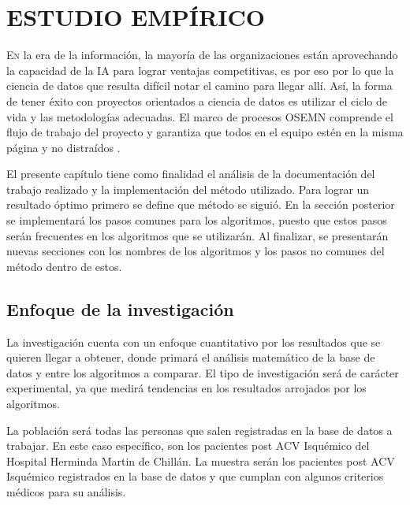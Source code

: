\doublespacing
\chapter{ESTUDIO EMPÍRICO}

\lettrine[lines=4, slope=0.2em, findent=0.2em, nindent=0.6em]{E}
n la era de la información, la mayoría de las organizaciones están aprovechando la capacidad de la IA para lograr ventajas competitivas, es por eso por lo que la ciencia de datos que resulta difícil notar el camino para llegar allí. Así, la forma de tener éxito con proyectos orientados a ciencia de datos es utilizar el ciclo de vida y las metodologías adecuadas. El marco de procesos OSEMN comprende el flujo de trabajo del proyecto y garantiza que todos en el equipo estén en la misma página y no distraídos \cite{Kumar2022}.\\
\par El presente capítulo tiene como finalidad el análisis de la documentación del trabajo realizado y la implementación del método utilizado.  Para lograr un resultado óptimo primero se define que método se siguió. En la sección posterior se implementará los pasos comunes para los algoritmos, puesto que estos pasos serán frecuentes en los algoritmos que se utilizarán. Al finalizar, se presentarán nuevas secciones con los nombres de los algoritmos y los pasos no comunes del método dentro de estos.\\

\doublespacing
\section{Enfoque de la investigación}
La investigación cuenta con un enfoque cuantitativo por los resultados que se quieren llegar a obtener, donde primará el análisis matemático de la base de datos y entre los algoritmos a comparar. El tipo de investigación será de carácter experimental, ya que medirá tendencias en los resultados arrojados por los algoritmos.\\
\par La población será todas las personas que salen registradas en la base de datos a trabajar. En este caso específico, son los pacientes post ACV Isquémico del Hospital Herminda Martin de Chillán. La muestra serán los pacientes post ACV Isquémico registrados en la base de datos y que cumplan con algunos criterios médicos para su análisis.\\


\doublespacing
